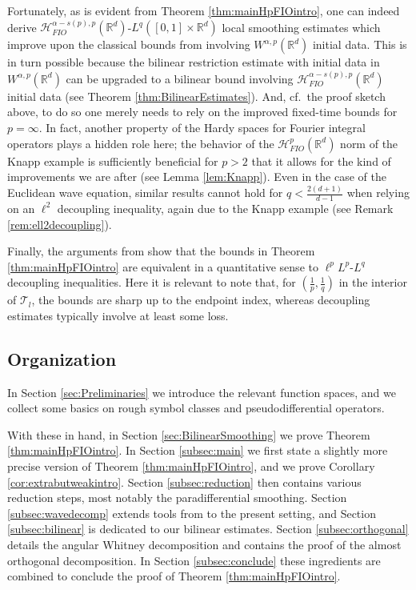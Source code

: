 \documentclass{amsart}
\numberwithin{equation}{section}
\theoremstyle{definition}
\newcommand{\R}{\mathbb{R}}
\newcommand{\Rd}{\mathbb{R}^{d}}
\newcommand {\HT}{\mathcal{H}}
\newcommand {\Hp}{\mathcal{H}^{p}_{FIO}(\R^d)}
\begin{document}
Fortunately, as is evident from Theorem \ref{thm:mainHpFIOintro}, one can indeed derive $\HT^{\alpha-s(p),p}_{FIO}(\Rd)$-$L^{q}([0,1]\times\Rd)$ local smoothing estimates which improve upon the classical bounds from \cite{TaoVargas2000,Lee2006} involving $W^{\alpha,p}(\Rd)$ initial data. This is in turn possible because the bilinear restriction estimate with initial data in $W^{\alpha,p}(\Rd)$ can be upgraded to a bilinear bound involving $\HT^{\alpha-s(p),p}_{FIO}(\Rd)$ initial data (see Theorem \ref{thm:BilinearEstimates}). And, cf.~the proof sketch above, to do so one merely needs to rely on the improved fixed-time bounds for $p=\infty$. In fact, another property of the Hardy spaces for Fourier integral operators plays a hidden role here; the behavior of the $\Hp$ norm of the Knapp example is sufficiently beneficial for $p>2$ that it allows for the kind of improvements we are after (see Lemma \ref{lem:Knapp}). Even in the case of the Euclidean wave equation, similar results cannot hold for $q<\frac{2(d+1)}{d-1}$ when relying on an $\ell^{2}$ decoupling inequality, again due to the Knapp example (see Remark \ref{rem:ell2decoupling}).

Finally, the arguments from \cite{Rozendaal22b,LiRoSoYa24} show that the bounds in Theorem \ref{thm:mainHpFIOintro} are equivalent in a quantitative sense to $\ell^{p}L^{p}$-$L^{q}$ decoupling inequalities. Here it is relevant to note that, for $(\frac{1}{p},\frac{1}{q})$ in the interior of $\mathcal{T}_{l}$, the bounds are sharp up to the endpoint index, whereas decoupling estimates typically involve at least some loss. 

\subsection{Organization}

In Section \ref{sec:Preliminaries} we introduce the relevant function spaces, and we collect some basics on rough symbol classes and pseudodifferential operators. 

With these in hand, in Section \ref{sec:BilinearSmoothing} we prove Theorem \ref{thm:mainHpFIOintro}. 
In Section \ref{subsec:main} we first state a slightly more precise version of Theorem \ref{thm:mainHpFIOintro}, and we prove Corollary \ref{cor:extrabutweakintro}. Section \ref{subsec:reduction} then contains various reduction steps, most notably the paradifferential smoothing. Section \ref{subsec:wavedecomp} extends 
tools from \cite{SchippaTataru2025} to the present setting, and Section \ref{subsec:bilinear} is dedicated to our bilinear estimates. Section \ref{subsec:orthogonal} details the angular Whitney decomposition and contains the proof of the almost orthogonal decomposition. 
In Section \ref{subsec:conclude} these ingredients are combined to conclude the proof of Theorem \ref{thm:mainHpFIOintro}. 
\end{document}
